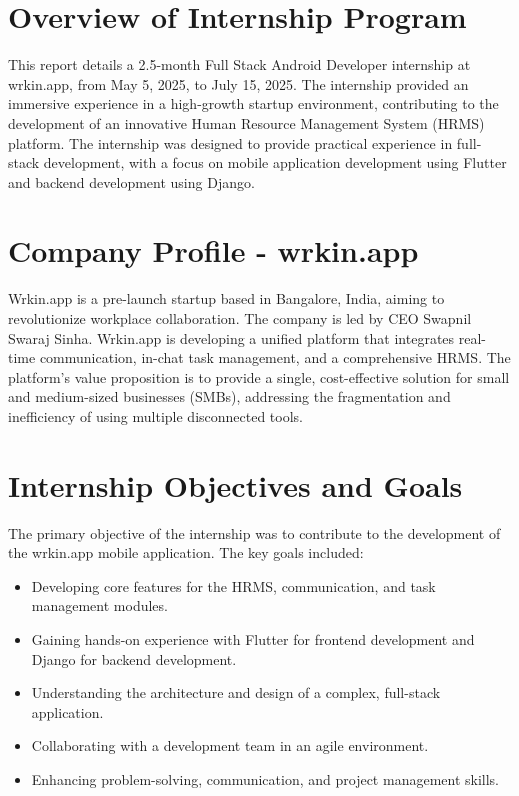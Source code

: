 \section{Overview of Internship Program}
This report details a 2.5-month Full Stack Android Developer internship at wrkin.app, from May 5, 2025, to July 15, 2025. The internship provided an immersive experience in a high-growth startup environment, contributing to the development of an innovative Human Resource Management System (HRMS) platform. The internship was designed to provide practical experience in full-stack development, with a focus on mobile application development using Flutter and backend development using Django.

\section{Company Profile - wrkin.app}
Wrkin.app is a pre-launch startup based in Bangalore, India, aiming to revolutionize workplace collaboration. The company is led by CEO Swapnil Swaraj Sinha. Wrkin.app is developing a unified platform that integrates real-time communication, in-chat task management, and a comprehensive HRMS. The platform's value proposition is to provide a single, cost-effective solution for small and medium-sized businesses (SMBs), addressing the fragmentation and inefficiency of using multiple disconnected tools.

\section{Internship Objectives and Goals}
The primary objective of the internship was to contribute to the development of the wrkin.app mobile application. The key goals included:
\begin{itemize}
    \item Developing core features for the HRMS, communication, and task management modules.
    \item Gaining hands-on experience with Flutter for frontend development and Django for backend development.
    \item Understanding the architecture and design of a complex, full-stack application.
    \item Collaborating with a development team in an agile environment.
    \item Enhancing problem-solving, communication, and project management skills.
\end{itemize}

